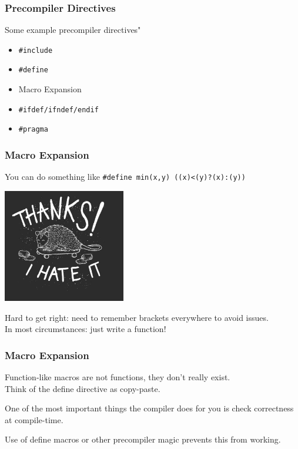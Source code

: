 \begin{frame}
\frametitle{Precompiler Directives}

Some example precompiler directives"

\begin{itemize}
	\item \texttt{\#include}
	\item \texttt{\#define}
	\item Macro Expansion
	\item \texttt{\#ifdef/ifndef/endif}	
	\item \texttt{\#pragma}
\end{itemize}

\end{frame}

\begin{frame}
\frametitle{Macro Expansion}

You can do something like \texttt{\#define min(x,y) ((x)<(y)?(x):(y))}

\begin{center}
  \includegraphics[width=0.4\textwidth]{images/thanksihateit.jpg}
\end{center}

Hard to get right: need to remember brackets everywhere to avoid issues.\\
\quad In most circumstances: just write a function!

\end{frame}

\begin{frame}
\frametitle{Macro Expansion}

Function-like macros are not functions, they don't really exist.\\
\quad Think of the define directive as copy-paste.

One of the most important things the compiler does for you is check correctness at compile-time.

Use of define macros or other precompiler magic prevents this from working.

\end{frame}


